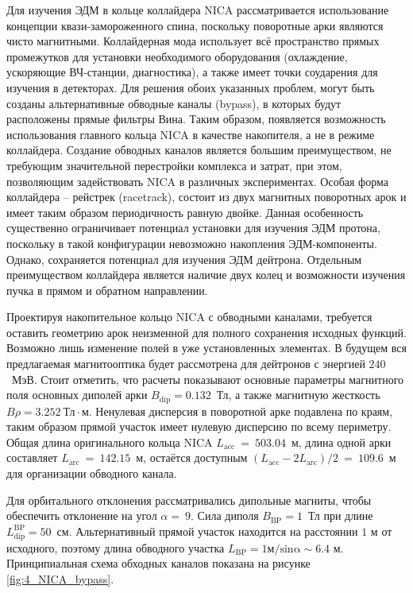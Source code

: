 \par Для изучения ЭДМ в кольце коллайдера NICA рассматривается использование концепции квази-замороженного спина, поскольку поворотные арки являются чисто магнитными. Коллайдерная мода использует всё пространство прямых промежутков для установки необходимого оборудования (охлаждение, ускоряющие ВЧ-станции, диагностика), а также имеет точки соударения для изучения в детекторах. Для решения обоих указанных проблем, могут быть созданы альтернативные обводные каналы (bypass), в которых будут расположены прямые фильтры Вина. Таким образом, появляется возможность использования главного кольца NICA в качестве накопителя, а не в режиме коллайдера. Создание обводных каналов является большим преимуществом, не требующим значительной перестройки комплекса и затрат, при этом, позволяющим задействовать NICA в различных экспериментах. Особая форма коллайдера -- рейстрек (racetrack), состоит из двух магнитных поворотных арок и имеет таким образом периодичность равную двойке. Данная особенность существенно ограничивает потенциал установки для изучения ЭДМ протона, поскольку в такой конфигурации невозможно накопления ЭДМ-компоненты. Однако, сохраняется потенциал для изучения ЭДМ дейтрона. Отдельным преимуществом коллайдера является наличие двух колец и возможности изучения пучка в прямом и обратном направлении.

\par Проектируя накопительное кольцо NICA с обводными каналами, требуется оставить геометрию арок неизменной для полного сохранения исходных функций. Возможно лишь изменение полей в уже установленных элементах. В будущем вся предлагаемая магнитооптика будет рассмотрена для дейтронов с энергией $240$~МэВ. Стоит отметить, что расчеты показывают основные параметры магнитного поля основных диполей арки $B_{\textrm{dip}}=0.132$~Тл, а также магнитную жесткость $B\rho=3.252 \ \textrm{Тл} \cdot$м. Ненулевая дисперсия в поворотной арке подавлена по краям, таким образом прямой участок имеет нулевую дисперсию по всему периметру. Общая длина оригинального кольца NICA $L_{\textrm{acc}}~=~503.04$~м, длина одной арки составляет $L_{\textrm{arc}}~=~142.15$~м, остаётся доступным $\left(L_{\textrm{acc}}-2L_{\textrm{arc}}\right)/2~=~109.6$~м для организации обводного канала.

\par Для орбитального отклонения рассматривались дипольные магниты, чтобы обеспечить отклонение на угол $\alpha=\ 9$. Сила диполя $B_{\textrm{BP}}=1$~Тл при длине $L_{\textrm{dip}}^{\textrm{BP}}=50$~см. Альтернативный прямой участок находится на расстоянии $1$ м от исходного, поэтому длина обводного участка $L_{\textrm{BP}}=1\mathrm{м/sin\alpha}\sim6.4$ м. Принципиальная схема обходных каналов показана на рисунке \ref{fig:4_NICA_bypass}.


